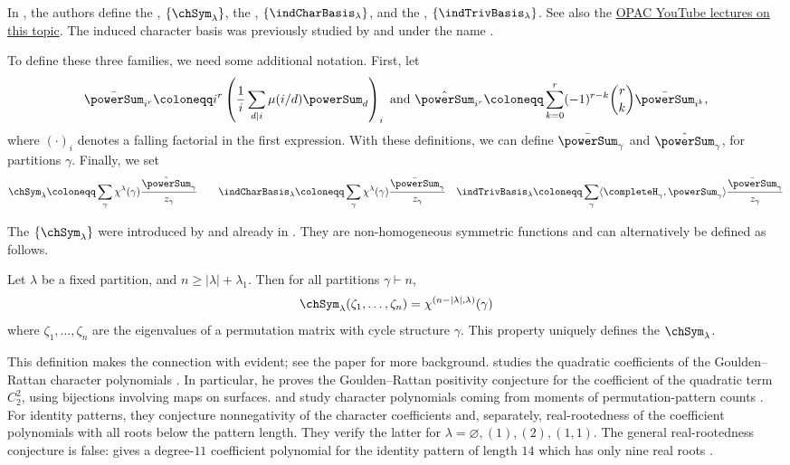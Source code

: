 In \cite{OrellanaZabrocki2018}, the authors define
the , $\{\chSym_\lambda\}$,
the , $\{\indCharBasis_\lambda\}$, and
the , $\{\indTrivBasis_\lambda\}$.
See also the \href{https://www.youtube.com/watch?v=4fDmCz9gWac}{OPAC YouTube lectures on this topic}.
The induced character basis was previously studied by 
and  \cite{AssafSpeyer2019} under the name
.

To define these three families, we need some additional notation.
First, let
\[
  \bar{\powerSum}_{i^r} \coloneqq i^r \left( \frac{1}{i} \sum_{d \mid i } \mu(i/d) \powerSum_d \right)_i
  \text{ and }
  \hat{\powerSum}_{i^r} \coloneqq \sum_{k=0}^r (-1)^{r-k} \binom{r}{k} \bar{\powerSum}_{i^k},
\]
where $(\cdot)_i$ denotes a falling factorial in the first expression.
With these definitions, we can define $\bar{\powerSum}_\gamma$ and
$\hat{\powerSum}_\gamma$, for partitions $\gamma$.
Finally, we set
\[
	\chSym_\lambda \coloneqq \sum_{\gamma} \chi^{\lambda}(\gamma) \frac{ \hat{\powerSum}_\gamma }{z_\gamma}
	\qquad 
	\indCharBasis_\lambda \coloneqq \sum_{\gamma} \chi^{\lambda}(\gamma) \frac{ \bar{\powerSum}_\gamma }{z_\gamma}
	\quad
	\indTrivBasis_\lambda \coloneqq \sum_{\gamma} \langle \completeH_\gamma, \powerSum_\gamma \rangle \frac{ \bar{\powerSum}_\gamma }{z_\gamma}
\]


The  $\{\chSym_\lambda\}$ were
introduced by  and  already in \cite{OrellanaZabrocki2016}.
They are non-homogeneous symmetric functions and can alternatively be defined as follows.

Let $\lambda$ be a fixed partition, and $n \geq |\lambda|+\lambda_1$.
Then for all partitions $\gamma \vdash n$,
\[
\chSym_\lambda(\zeta_{1},\dotsc,\zeta_{n}) = \chi^{(n-|\lambda|,\lambda)}(\gamma)
\]
where $\zeta_{1},\dotsc,\zeta_{n}$ are the eigenvalues of 
a permutation matrix with cycle structure $\gamma$.
This property uniquely defines the $\chSym_\lambda$.

This definition makes the connection with 
evident; see the paper \cite{GarsiaGoupil2009} for more background.
 studies the quadratic coefficients of the
Goulden--Rattan character polynomials \cite{Marciniak2021GouldenRattan}.
In particular, he proves the Goulden--Rattan positivity conjecture for the
coefficient of the quadratic term $C_2^2$, using bijections involving maps on
surfaces.
 and  study character polynomials
coming from moments of permutation-pattern counts
\cite[Conj.~1.4 and Thm.~1.5]{GaetzPierson2022x}.
For identity patterns, they conjecture nonnegativity of the character
coefficients and, separately, real-rootedness of the coefficient polynomials
with all roots below the pattern length.  They verify the latter for
$\lambda=\varnothing,(1),(2),(1,1)$.  The general real-rootedness conjecture
is false:
 gives a degree-$11$ coefficient polynomial for the
identity pattern of length $14$ which has only nine real roots
\cite[Ex.~1.1]{Iskander2023x}.


